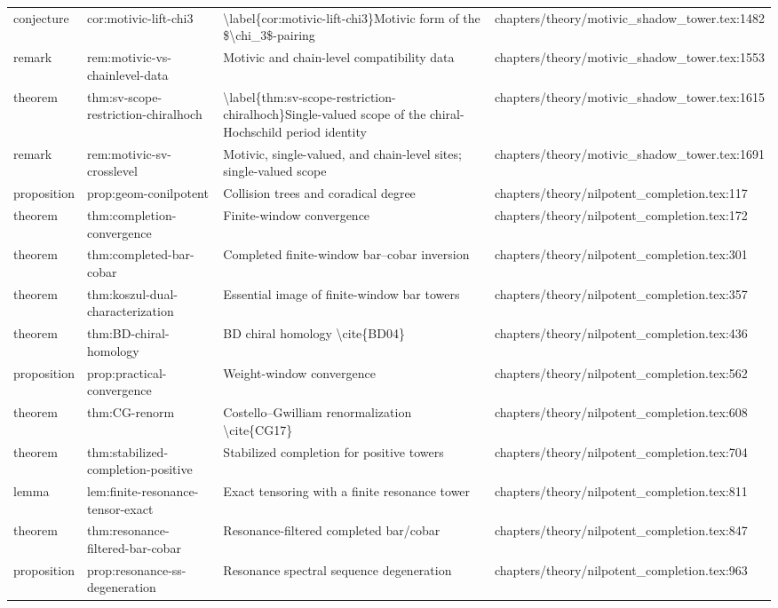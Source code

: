 \documentclass[11pt]{article}
\begin{document}
\begin{longtable}{L{0.10\textwidth}L{0.26\textwidth}L{0.42\textwidth}L{0.22\textwidth}}
conjecture & cor:motivic-lift-chi3 & \textbackslash{}label\{cor:motivic-lift-chi3\}Motivic form of the \$\textbackslash{}chi\_3\$-pairing & chapters/theory/motivic\_shadow\_tower.tex:1482\\
remark & rem:motivic-vs-chainlevel-data & Motivic and chain-level compatibility data & chapters/theory/motivic\_shadow\_tower.tex:1553\\
theorem & thm:sv-scope-restriction-chiralhoch & \textbackslash{}label\{thm:sv-scope-restriction-chiralhoch\}Single-valued scope of the chiral-Hochschild period identity & chapters/theory/motivic\_shadow\_tower.tex:1615\\
remark & rem:motivic-sv-crosslevel & Motivic, single-valued, and chain-level sites; single-valued scope & chapters/theory/motivic\_shadow\_tower.tex:1691\\
proposition & prop:geom-conilpotent & Collision trees and coradical degree & chapters/theory/nilpotent\_completion.tex:117\\
theorem & thm:completion-convergence & Finite-window convergence & chapters/theory/nilpotent\_completion.tex:172\\
theorem & thm:completed-bar-cobar & Completed finite-window bar--cobar inversion & chapters/theory/nilpotent\_completion.tex:301\\
theorem & thm:koszul-dual-characterization & Essential image of finite-window bar towers & chapters/theory/nilpotent\_completion.tex:357\\
theorem & thm:BD-chiral-homology & BD chiral homology \textbackslash{}cite\{BD04\} & chapters/theory/nilpotent\_completion.tex:436\\
proposition & prop:practical-convergence & Weight-window convergence & chapters/theory/nilpotent\_completion.tex:562\\
theorem & thm:CG-renorm & Costello--Gwilliam renormalization \textbackslash{}cite\{CG17\} & chapters/theory/nilpotent\_completion.tex:608\\
theorem & thm:stabilized-completion-positive & Stabilized completion for positive towers & chapters/theory/nilpotent\_completion.tex:704\\
lemma & lem:finite-resonance-tensor-exact & Exact tensoring with a finite resonance tower & chapters/theory/nilpotent\_completion.tex:811\\
theorem & thm:resonance-filtered-bar-cobar & Resonance-filtered completed bar/cobar & chapters/theory/nilpotent\_completion.tex:847\\
proposition & prop:resonance-ss-degeneration & Resonance spectral sequence degeneration & chapters/theory/nilpotent\_completion.tex:963\\

\end{longtable}
\end{document}
